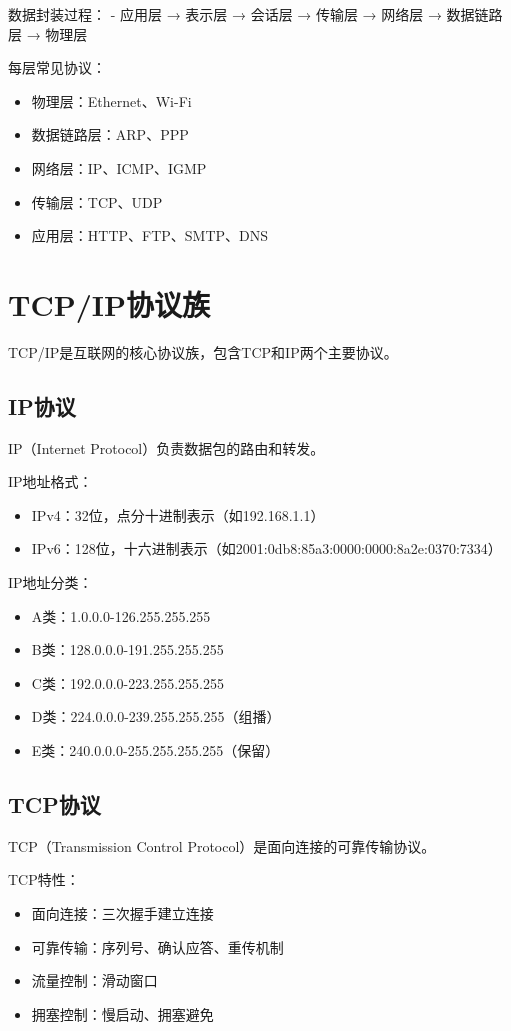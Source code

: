 \documentclass[12pt,UTF8]{ctexbook}
\begin{document}
数据封装过程：
- 应用层 → 表示层 → 会话层 → 传输层 → 网络层 → 数据链路层 → 物理层

每层常见协议：
\begin{itemize}
    \item 物理层：Ethernet、Wi-Fi
    \item 数据链路层：ARP、PPP
    \item 网络层：IP、ICMP、IGMP
    \item 传输层：TCP、UDP
    \item 应用层：HTTP、FTP、SMTP、DNS
\end{itemize}

\section{TCP/IP协议族}
\label{sec:tcp-ip}

TCP/IP是互联网的核心协议族，包含TCP和IP两个主要协议。

\subsection*{IP协议}
IP（Internet Protocol）负责数据包的路由和转发。

IP地址格式：
\begin{itemize}
    \item IPv4：32位，点分十进制表示（如192.168.1.1）
    \item IPv6：128位，十六进制表示（如2001:0db8:85a3:0000:0000:8a2e:0370:7334）
\end{itemize}

IP地址分类：
\begin{itemize}
    \item A类：1.0.0.0-126.255.255.255
    \item B类：128.0.0.0-191.255.255.255
    \item C类：192.0.0.0-223.255.255.255
    \item D类：224.0.0.0-239.255.255.255（组播）
    \item E类：240.0.0.0-255.255.255.255（保留）
\end{itemize}

\subsection*{TCP协议}
TCP（Transmission Control Protocol）是面向连接的可靠传输协议。

TCP特性：
\begin{itemize}
    \item 面向连接：三次握手建立连接
    \item 可靠传输：序列号、确认应答、重传机制
    \item 流量控制：滑动窗口
    \item 拥塞控制：慢启动、拥塞避免
\end{itemize}
\end{document}

